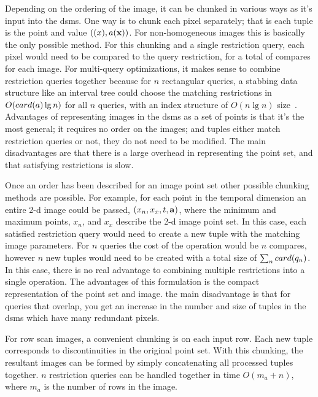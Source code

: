 \documentclass{vldb}
\begin{document}
Depending on the ordering of the image, it can be chunked in various
ways as it's input into the \ac{dsms}.  One way is to chunk each pixel
separately; that is each tuple is the point and value
$({\bf{(}}x),a({\bf{x}}))$.  For non-homogeneous images this is basically
the only possible method.  For this chunking and a single restriction
query, each pixel would need to be compared to the query restriction,
for a total of  compares for each image.  For multi-query
optimizations, it makes sense to combine restriction queries together
because for $n$ rectangular queries, a stabbing data structure like an
interval tree could choose the matching restrictions in
$O({card(a)}\lg{n})$ for all $n$ queries, with an index structure of
$O(n\lg{n})$ size~\cite{spatialalgos}.  Advantages of representing
images in the \ac{dsms} as a set of points is that it's the most
general; it requires no order on the images; and tuples either match
restriction queries or not, they do not need to be modified.  The main
disadvantages are that there is a large overhead in representing the
point set, and that satisfying restrictions is slow.

Once an order has been described for an image point set other possible
chunking methods are possible.  For example, for each point in the
temporal dimension an entire 2-d image could be passed,
$(x_n,x_x,t,{\bf{a}})$, where the minimum and maximum points, $x_n$, and
$x_x$ describe the 2-d image point set.  In this case, each satisfied
restriction query would need to create a new tuple with the matching
image parameters.  For $n$ queries the cost of the operation would be
$n$ compares, however $n$ new tuples would need to be created with a
total size of $\sum_{n} {card(q_n)}$.  In this case, there is no real
advantage to combining multiple restrictions into a single operation.
The advantages of this formulation is the compact representation of
the point set and image.  the main disadvantage is that for queries
that overlap, you get an increase in the number and size of tuples in
the \ac{dsms} which have many redundant pixels.

For row scan images, a convenient chunking is on each input row.  Each
new tuple corresponds to discontinuities in the original point set.
With this chunking, the resultant images can be formed by simply
concatenating all processed tuples together.  $n$ restriction queries
can be handled together in time $O(m_a+n)$, where $m_a$ is the number
of rows in the image.
\end{document}
